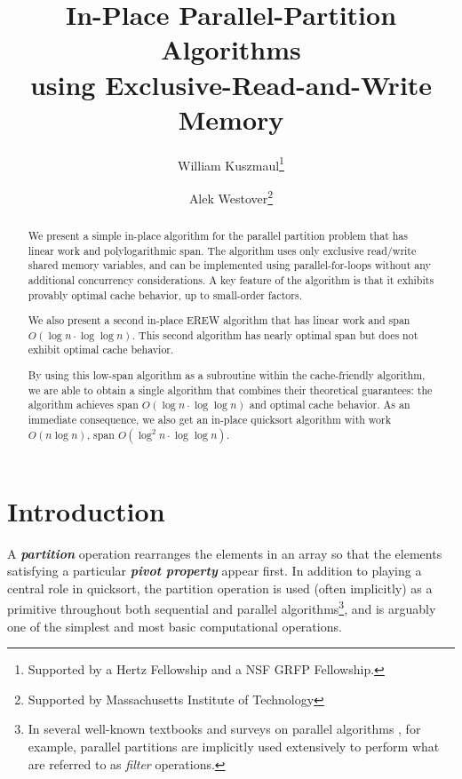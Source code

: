 \documentclass[11pt]{article}
\newcommand{\defn}[1]{{\textit{\textbf{\boldmath #1}}}}
\theoremstyle{remark}
\theoremstyle{remark}
\begin{document}
\title{\Large In-Place Parallel-Partition Algorithms \\using
Exclusive-Read-and-Write Memory}
\author[1]{William Kuszmaul\thanks{Supported by a Hertz
Fellowship and a NSF GRFP Fellowship.}}
\author[1]{Alek Westover\thanks{Supported by Massachusetts Institute of Technology}}

\date{}

\maketitle
\begin{abstract} 
  We present a simple in-place algorithm for the parallel partition
  problem that has linear work and polylogarithmic span. The algorithm
  uses only exclusive read/write shared memory variables, and can be
  implemented using parallel-for-loops without any additional
  concurrency considerations. A key feature of the algorithm is that
  it exhibits provably optimal cache behavior, up to small-order
  factors.

  We also present a second in-place EREW algorithm that has linear
  work and span $O(\log n \cdot \log \log n)$. This second algorithm
  has nearly optimal span but does not exhibit optimal cache behavior.

  By using this low-span algorithm as a subroutine within the
  cache-friendly algorithm, we are able to obtain a single algorithm
  that combines their theoretical guarantees: the algorithm achieves
  span $O(\log n \cdot \log \log n)$ and optimal cache behavior. As an
  immediate consequence, we also get an in-place quicksort algorithm
  with work $O(n \log n)$, span $O(\log^2 n \cdot \log \log n)$.
\end{abstract}

\clearpage

\section{Introduction}

A \defn{partition} operation rearranges the elements in an array so
that the elements satisfying a particular \defn{pivot property} appear
first. In addition to playing a central role in quicksort, the
partition operation is used (often implicitly) as a primitive
throughout both sequential and parallel algorithms\footnote{In several
  well-known textbooks and surveys on parallel algorithms
  \cite{AcarBl16,Blelloch96}, for example, parallel partitions are
  implicitly used extensively to perform what are referred to as
  \emph{filter} operations.}, and is arguably one of the simplest and
most basic computational operations.
\end{document}
